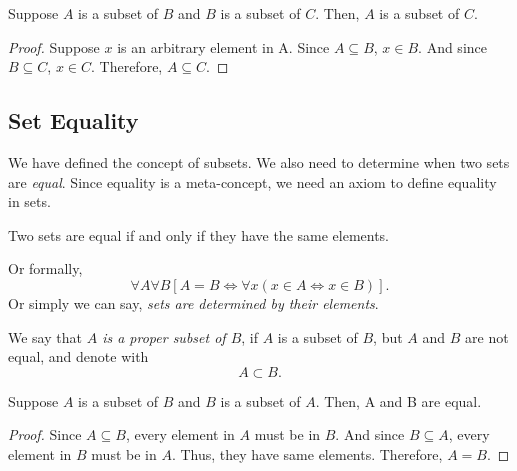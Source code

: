 \begin{theorem*} Suppose $A$ is a subset of $B$ and $B$ is a subset 
of $C$. Then, $A$ is a subset of $C$.\end{theorem*}
\begin{proof}
    Suppose $x$ is an arbitrary element in A. Since $A \subseteq B$, $x \in B$.
    And since $B \subseteq C$, $x \in C$. Therefore, $A \subseteq C$.
\end{proof}

\subsection{Set Equality}
We have defined the concept of subsets. We also need to determine when two sets
are \textit{equal}. Since equality is a meta-concept, we need an axiom to define equality
in sets.
\begin{axiom*}
    Two sets are equal if and only if they have the same elements.
\end{axiom*}
Or formally, \[\forall A \forall B [A = B \iff \forall x (x \in A \iff x \in B)].\]
Or simply we can say, \textit{sets are determined by their elements}.

We say that \textit{$A$ is a proper subset of $B$}, if $A$ is a subset of $B$,
but $A$ and $B$ are not equal, and denote with \[A \subset B.\]

\begin{theorem*} Suppose $A$ is a subset of $B$ and $B$ is a subset of $A$.
Then, A and B are equal. \end{theorem*}
\begin{proof}[Proof]
    Since $A \subseteq B$, every element in $A$ must be in $B$. And since
    $B \subseteq A$, every element in $B$ must be in $A$. Thus, they have
    same elements. Therefore, $A = B$.
\end{proof}

